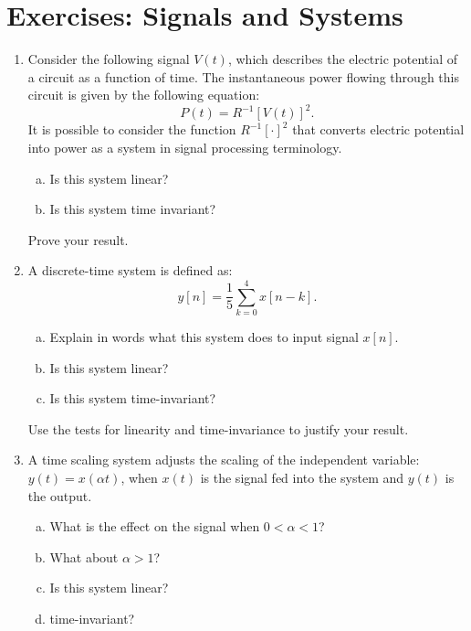 \newpage
\section{Exercises: Signals and Systems}
\begin{enumerate}

\item Consider the following signal $V(t)$, which describes the electric potential of a circuit as a function of time. The instantaneous power flowing through this circuit is given by the following equation:
\begin{equation*}
    P(t)=R^{-1}[V(t)]^2.
\end{equation*}
It is possible to consider the function $R^{-1}[\cdot]^2$ that converts electric potential into power as a system in signal processing terminology.
\begin{enumerate}[a)]
\item Is this system linear?
\item Is this system time invariant?
\end{enumerate}
Prove your result.

\item A discrete-time system is defined as:
\begin{equation}
  y[n]= \frac{1}{5}\sum_{k=0}^{4} x[n-k].
\end{equation}
  \begin{enumerate}[a)]
  \item Explain in words what this system does to input signal $x[n]$.
  \item Is this system linear?
  \item Is this system time-invariant?
  \end{enumerate}
Use the tests for linearity and time-invariance to justify your result. 

\item A time scaling system adjusts the scaling of the independent variable: $y(t) = x(\alpha t)$,
when $x(t)$ is the signal fed into the system and $y(t)$ is the output.

\begin{enumerate}[a)]
\item What is the effect on the signal when $0<\alpha<1$?
\item What about $\alpha>1$?
\item Is this system linear?
\item time-invariant?
\end{enumerate}


\end{enumerate}
